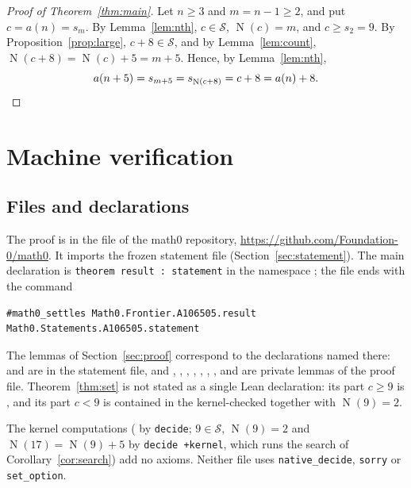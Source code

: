 \documentclass[11pt]{amsart}
\theoremstyle{plain}
\theoremstyle{definition}
\newcommand{\code}[1]{\texttt{#1}}
\newcommand{\Side}{\mathcal{S}}
\DeclareMathOperator{\cnt}{N}
\begin{document}
\begin{proof}[Proof of Theorem~\ref{thm:main}]
Let $n\ge3$ and $m=n-1\ge2$, and put $c=a(n)=s_m$. By Lemma~\ref{lem:nth}, $c\in\Side$, $\cnt(c)=m$, and $c\ge s_2=9$. By Proposition~\ref{prop:large}, $c+8\in\Side$, and by Lemma~\ref{lem:count}, $\cnt(c+8)=\cnt(c)+5=m+5$. Hence, by Lemma~\ref{lem:nth},
\[
  a(n+5)=s_{m+5}=s_{\cnt(c+8)}=c+8=a(n)+8.\qedhere
\]
\end{proof}

\section{Machine verification}\label{sec:lean}

\subsection*{Files and declarations}
The proof is in the file  of the math0 repository, \url{https://github.com/Foundation-0/math0}. It imports the frozen statement file (Section~\ref{sec:statement}). The main declaration is \code{theorem result : statement} in the namespace ; the file ends with the command
\begin{lstlisting}
#math0_settles Math0.Frontier.A106505.result Math0.Statements.A106505.statement
\end{lstlisting}
The lemmas of Section~\ref{sec:proof} correspond to the declarations named there:  and  are in the statement file, and , , , , , , ,  and  are private lemmas of the proof file. Theorem~\ref{thm:set} is not stated as a single Lean declaration: its part $c\ge9$ is , and its part $c<9$ is contained in the kernel-checked  together with $\cnt(9)=2$.

The kernel computations ( by \texttt{decide}; $9\in\Side$, $\cnt(9)=2$ and $\cnt(17)=\cnt(9)+5$ by \texttt{decide +kernel}, which runs the search of Corollary~\ref{cor:search}) add no axioms. Neither file uses \texttt{native\_decide}, \texttt{sorry} or \texttt{set\_option}.
\end{document}
